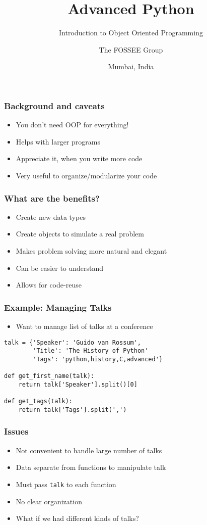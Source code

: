 \documentclass[14pt,compress,aspectratio=169]{beamer}
\title[Introduction to OOP]{Advanced Python}
\subtitle{Introduction to Object Oriented Programming }
\author[FOSSEE] {The FOSSEE Group}
\institute[IIT Bombay] {Department of Aerospace Engineering\\IIT Bombay}
\date[] {Mumbai, India}
\begin{document}
\begin{frame}
  \titlepage
\end{frame}

\begin{frame}
  \frametitle{Background and caveats}
  \begin{itemize}
  \item You don't need OOP for everything!
  \item Helps with larger programs
  \item Appreciate it, when you write more code
  \item Very useful to organize/modularize your code
  \end{itemize}
\end{frame}

\begin{frame}[fragile]
  \frametitle{What are the benefits?}
  \begin{itemize}
  \item Create new data types
  \item Create objects to simulate a real problem
  \item Makes problem solving more natural and elegant
  \item Can be easier to understand
  \item Allows for code-reuse
  \end{itemize}
\end{frame}


\begin{frame}[fragile]
  \frametitle{Example: Managing Talks}
  \begin{itemize}
  \item Want to manage list of talks at a conference
  \end{itemize}
  \begin{lstlisting}
talk = {'Speaker': 'Guido van Rossum',
        'Title': 'The History of Python'
        'Tags': 'python,history,C,advanced'}

def get_first_name(talk):
    return talk['Speaker'].split()[0]

def get_tags(talk):
    return talk['Tags'].split(',')
  \end{lstlisting}
\end{frame}

\begin{frame}
  \frametitle{Issues}
  \begin{itemize}
  \item Not convenient to handle large number of talks
  \item Data separate from functions to manipulate talk
  \item Must pass \lstinline{talk} to each function
  \item No clear organization
  \item What if we had different kinds of talks?
  \end{itemize}
\end{frame}
\end{document}
